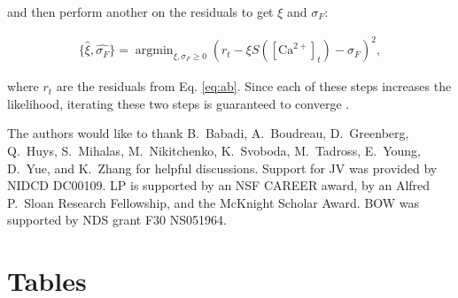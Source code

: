 \documentclass[10pt]{article}
\DeclareMathOperator*{\argmin}{argmin}
\newcommand{\Ca}{[\text{Ca}^{2+}]}
\begin{document}
\noindent and then perform another on the residuals to get $\xi$ and $\sigma_F$:

\begin{align}
\{\widehat{\xi},\widehat{\sigma_F}\} = \argmin_{\xi, \sigma_F \geq 0} (r_t-\xi S(\Ca_t) - \sigma_F)^2,
\end{align}

\noindent where $r_t$ are the residuals from Eq. \ref{eq:ab}.  Since each of these steps increases the likelihood, iterating these two steps is guaranteed to converge  \cite{ShumwayStoffer06}.

\begin{table}[b]
\small{The authors would like to thank B.\ Babadi, A.\ Boudreau,  D.\ Greenberg, Q.\ Huys, S.\ Mihalas, M.\ Nikitchenko, K.\ Svoboda, M.\ Tadross, E.\ Young, D.\ Yue, and K.\ Zhang for helpful discussions.  Support for JV was provided by NIDCD DC00109.  LP is supported by an NSF CAREER award, by an Alfred P.\ Sloan Research Fellowship, and the McKnight Scholar Award. BOW was supported by NDS grant F30 NS051964.}
\end{table}

\clearpage \newpage

%


\newpage



\section*{Tables}
\end{document}
